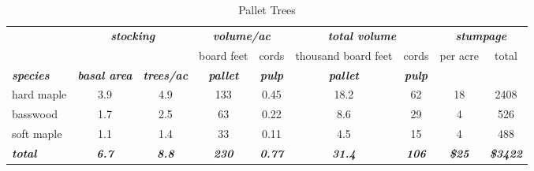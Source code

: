 \documentclass[landscape]{article}
\begin{document}
\begin{table}[H]

\caption{\label{tab:unnamed-chunk-62}Pallet Trees}
\fontsize{10}{12}\selectfont
\begin{tabular}[t]{lcccccccc}
\toprule
\multicolumn{1}{c}{\em{\textbf{ }}} & \multicolumn{2}{c}{\em{\textbf{stocking}}} & \multicolumn{2}{c}{\em{\textbf{volume/ac }}} & \multicolumn{2}{c}{\em{\textbf{total volume}}} & \multicolumn{2}{c}{\em{\textbf{stumpage}}} \\
\cmidrule(l{3pt}r{3pt}){2-3} \cmidrule(l{3pt}r{3pt}){4-5} \cmidrule(l{3pt}r{3pt}){6-7} \cmidrule(l{3pt}r{3pt}){8-9}
\multicolumn{3}{c}{ } & \multicolumn{1}{c}{board feet} & \multicolumn{1}{c}{cords} & \multicolumn{1}{c}{thousand board feet} & \multicolumn{1}{c}{cords} & \multicolumn{1}{c}{per acre} & \multicolumn{1}{c}{total} \\
\cmidrule(l{3pt}r{3pt}){4-4} \cmidrule(l{3pt}r{3pt}){5-5} \cmidrule(l{3pt}r{3pt}){6-6} \cmidrule(l{3pt}r{3pt}){7-7} \cmidrule(l{3pt}r{3pt}){8-8} \cmidrule(l{3pt}r{3pt}){9-9}
\rowcolor[HTML]{DCDCDC}  \em{\textbf{species}} & \em{\textbf{basal area}} & \em{\textbf{trees/ac}} & \em{\textbf{pallet}} & \em{\textbf{pulp}} & \em{\textbf{pallet}} & \em{\textbf{pulp}} & \em{\textbf{ }} & \em{\textbf{ }}\\
\midrule
\rowcolor{gray!6}  hard maple & 3.9 & 4.9 & 133 & 0.45 & 18.2 & 62 & 18 & 2408\\
 
basswood & 1.7 & 2.5 & 63 & 0.22 & 8.6 & 29 & 4 & 526\\
 
\rowcolor{gray!6}  soft maple & 1.1 & 1.4 & 33 & 0.11 & 4.5 & 15 & 4 & 488\\
 
\rowcolor[HTML]{DCDCDC}  \em{\textbf{total}} & \em{\textbf{6.7}} & \em{\textbf{8.8}} & \em{\textbf{230}} & \em{\textbf{0.77}} & \em{\textbf{31.4}} & \em{\textbf{106}} & \em{\textbf{\$25}} & \em{\textbf{\$3422}}\\
\bottomrule
\end{tabular}
\end{table}
\end{document}
